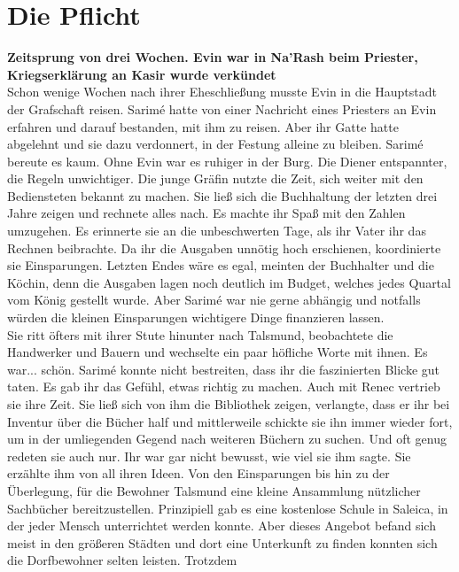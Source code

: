 
\chapter{Die Pflicht}

\textbf{Zeitsprung von drei Wochen. Evin war in Na'Rash beim Priester, Kriegserklärung an Kasir 
wurde verkündet}\\

Schon wenige Wochen nach ihrer Eheschließung musste Evin in die Hauptstadt der Grafschaft reisen. 
Sarimé hatte von einer Nachricht eines Priesters an Evin erfahren und darauf bestanden, mit ihm zu 
reisen. Aber ihr Gatte hatte abgelehnt und sie dazu verdonnert, in der Festung alleine zu bleiben. 
Sarimé bereute es kaum. Ohne Evin war es ruhiger in der Burg. Die Diener entspannter, die Regeln 
unwichtiger. Die junge Gräfin nutzte die Zeit, sich weiter mit den Bediensteten bekannt zu machen. 
Sie ließ sich die Buchhaltung der letzten drei Jahre zeigen und rechnete alles nach. Es machte ihr 
Spaß mit den Zahlen umzugehen. Es erinnerte sie an die unbeschwerten Tage, als ihr Vater ihr das 
Rechnen beibrachte. Da ihr die Ausgaben unnötig hoch erschienen, koordinierte sie Einsparungen. 
Letzten Endes wäre es egal, meinten der Buchhalter und die Köchin, denn die Ausgaben lagen noch 
deutlich im Budget, welches jedes Quartal vom König gestellt wurde. Aber Sarimé war nie gerne 
abhängig und notfalls würden die kleinen Einsparungen wichtigere Dinge finanzieren lassen. \\
Sie ritt öfters mit ihrer Stute hinunter nach Talsmund, beobachtete die Handwerker und 
Bauern und wechselte ein paar höfliche Worte mit ihnen. Es war... schön. Sarimé konnte nicht 
bestreiten, dass ihr die faszinierten Blicke gut taten. Es gab ihr das Gefühl, etwas richtig zu 
machen. Auch mit Renec vertrieb sie ihre Zeit. Sie ließ sich von ihm die Bibliothek zeigen, 
verlangte, dass er ihr bei Inventur über die Bücher half und mittlerweile schickte sie ihn immer 
wieder fort, um in der umliegenden Gegend nach weiteren Büchern zu suchen. Und oft genug redeten sie 
auch nur. Ihr war gar nicht bewusst, wie viel sie ihm sagte. Sie erzählte ihm von all ihren Ideen. 
Von den Einsparungen bis hin zu der Überlegung, für die Bewohner Talsmund eine kleine Ansammlung 
nützlicher Sachbücher bereitzustellen. Prinzipiell gab es eine kostenlose Schule in Saleica, in der 
jeder Mensch unterrichtet werden konnte. Aber dieses Angebot befand sich meist in den größeren 
Städten und dort eine Unterkunft zu finden konnten sich die Dorfbewohner selten leisten. Trotzdem 
